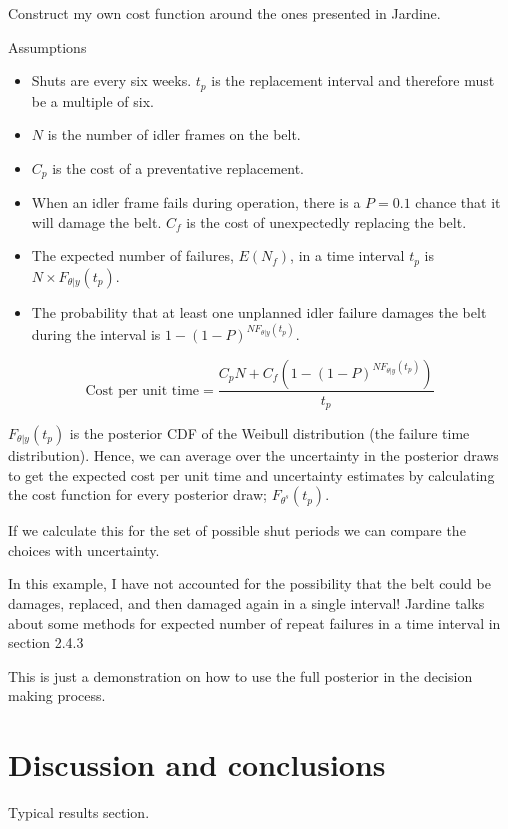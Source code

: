 Construct my own cost function around the ones presented in Jardine.

Assumptions
\begin{itemize}
  \item Shuts are every six weeks. $t_p$ is the replacement interval and therefore must be a multiple of six.
  \item $N$ is the number of idler frames on the belt.
  \item $C_p$ is the cost of a preventative replacement.
  \item When an idler frame fails during operation, there is a $P = 0.1$ chance that it will damage the belt. $C_f$ is the cost of unexpectedly replacing the belt.
  \item The expected number of failures, $E(N_f)$, in a time interval $t_p$ is $N \times F_{\theta|y}(t_p)$.
  \item The probability that at least one unplanned idler failure damages the belt during the interval is $1 - (1 - P)^{N F_{\theta|y}(t_p)}$.
\end{itemize}

\begin{equation}
  \text{Cost per unit time} = \frac{C_p N + C_f (1 - (1 - P)^{N F_{\theta|y}(t_p)})}{t_p}
\end{equation}

$F_{\theta|y}(t_p)$ is the posterior CDF of the Weibull distribution (the failure time distribution). Hence, we can average over the uncertainty in the posterior draws to get the expected cost per unit time and uncertainty estimates by calculating the cost function for every posterior draw; $F_{\theta^s}(t_p)$.

If we calculate this for the set of possible shut periods we can compare the choices with uncertainty.

In this example, I have not accounted for the possibility that the belt could be damages, replaced, and then damaged again in a single interval! Jardine talks about some methods for expected number of repeat failures in a time interval in section 2.4.3

This is just a demonstration on how to use the full posterior in the decision making process.

\section{Discussion and conclusions}

Typical results section.